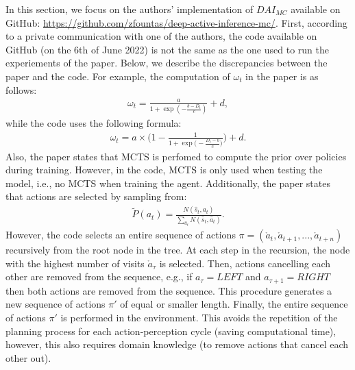 \documentclass[twoside,11pt]{article}
\begin{document}
In this section, we focus on the authors' implementation of $DAI_{MC}$ available on GitHub: \url{https://github.com/zfountas/deep-active-inference-mc/}. First, according to a private communication with one of the authors, the code available on GitHub (on the 6th of June 2022) is not the same as the one used to run the experiements of the paper. Below, we describe the discrepancies between the paper and the code. For example, the computation of $\omega_t$ in the paper is as follows:
\begin{align*}
\omega_t = \frac{a}{1 + \exp(-\frac{b - D_t}{c})} + d,
\end{align*}
while the code uses the following formula:
\begin{align*}
\omega_t = a\times \Bigg(1 - \frac{1}{1 + \exp\big(-\frac{D_t - b}{c}\big)}\Bigg) + d.
\end{align*}
Also, the paper states that MCTS is perfomed to compute the prior over policies during training. However, in the code, MCTS is only used when testing the model, i.e., no MCTS when training the agent. Additionally, the paper states that actions are selected by sampling from:
\begin{align*}
\tilde{P}(a_t) = \frac{N(\hat{s}_t, a_t)}{\sum_{\hat{a}_t}N(\hat{s}_t, \hat{a}_t)}.
\end{align*}
However, the code selects an entire sequence of actions $\pi = (\mathring{a}_t, \mathring{a}_{t+1}, ..., \mathring{a}_{t+n})$ recursively from the root node in the tree. At each step in the recursion, the node with the highest number of visits $\mathring{a}_\tau$ is selected. Then, actions cancelling each other are removed from the sequence, e.g., if $a_\tau = LEFT$ and $a_{\tau+1} = RIGHT$ then both actions are removed from the sequence. This procedure generates a new sequence of actions $\pi'$ of equal or smaller length. Finally, the entire sequence of actions $\pi'$  is performed in the environment. This avoids the repetition of the planning process for each action-perception cycle (saving computational time), however, this also requires domain knowledge (to remove actions that cancel each other out).
\end{document}

